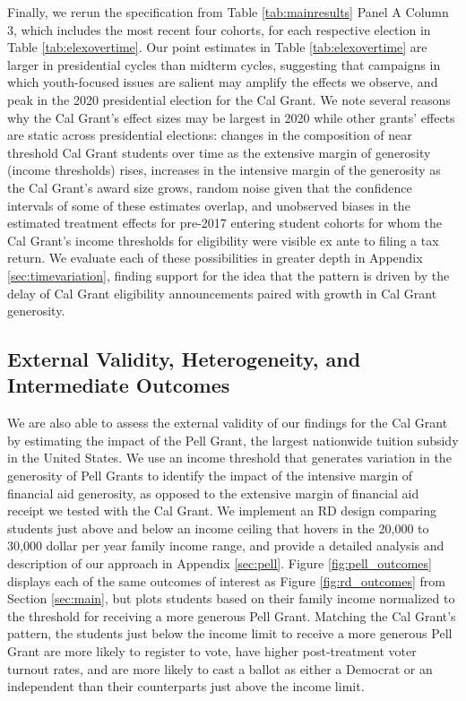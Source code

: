 \documentclass[12pt,letterpaper,oneside]{book}
\begin{document}
Finally, we rerun the specification from Table \ref{tab:mainresults} Panel A Column 3, which includes the most recent four  cohorts, for each respective election in Table \ref{tab:elexovertime}. Our point estimates in Table \ref{tab:elexovertime} are larger in presidential cycles than midterm cycles, suggesting that campaigns in which youth-focused issues are salient may amplify the effects we observe, and peak in the 2020 presidential election for the Cal Grant. We note several reasons why the Cal Grant's effect sizes may be largest in 2020 while other grants' effects are static across presidential elections: changes in the composition of near threshold Cal Grant students over time as the extensive margin of generosity (income thresholds) rises, increases in the intensive margin of the generosity as the Cal Grant's award size grows, random noise given that the confidence intervals of some of these estimates overlap, and unobserved biases in the estimated treatment effects for pre-2017 entering student cohorts for whom the Cal Grant's income thresholds for eligibility were visible ex ante to filing a tax return. We evaluate each of these possibilities in greater depth in Appendix \ref{sec:timevariation}, finding  support for the idea that the pattern is driven by the delay of Cal Grant eligibility announcements paired with growth in Cal Grant generosity.

\subsection{External Validity, Heterogeneity, and Intermediate Outcomes}\label{sec:HTE_int}

We are also able to assess the external validity of our findings for the Cal Grant by estimating the impact of the Pell Grant, the largest nationwide tuition subsidy in the United States. We use an income threshold that generates variation in the generosity of Pell Grants to identify the impact of the intensive margin of financial aid generosity, as opposed to the extensive margin of financial aid receipt we tested with the Cal Grant. We implement an RD design comparing students just above and below an income ceiling that hovers in the 20,000 to 30,000 dollar per year family income range, and provide a detailed analysis and description of our approach in Appendix \ref{sec:pell}. Figure \ref{fig:pell_outcomes} displays each of the same outcomes of interest as Figure \ref{fig:rd_outcomes} from Section \ref{sec:main}, but plots students based on their family income normalized to the threshold for receiving a more generous Pell Grant. Matching the Cal Grant's pattern, the students just below the income limit to receive a more generous Pell Grant are more likely to register to vote, have higher post-treatment voter turnout rates, and are more likely to cast a ballot as either a Democrat or an independent than their counterparts just above the income limit.
\end{document}
